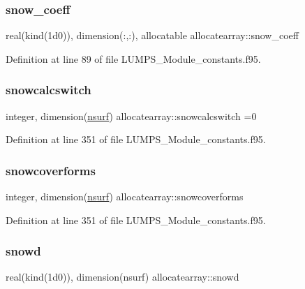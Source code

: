 \subsubsection{\texorpdfstring{snow\+\_\+coeff}{snow\_coeff}}
{\footnotesize\ttfamily real(kind(1d0)), dimension(\+:,\+:), allocatable allocatearray\+::snow\+\_\+coeff}



Definition at line 89 of file L\+U\+M\+P\+S\+\_\+\+Module\+\_\+constants.\+f95.

\mbox{\label{namespaceallocatearray_ae1fb990049408fe1fa4f557577937ed6}} 
\subsubsection{\texorpdfstring{snowcalcswitch}{snowcalcswitch}}
{\footnotesize\ttfamily integer, dimension(\hyperlink{namespaceallocatearray_acd22f92a06f7e9a2a91426b3dc99fdb0}{nsurf}) allocatearray\+::snowcalcswitch =0}



Definition at line 351 of file L\+U\+M\+P\+S\+\_\+\+Module\+\_\+constants.\+f95.

\mbox{\label{namespaceallocatearray_aa5bce865502bab8845c8ce638efee764}} 
\subsubsection{\texorpdfstring{snowcoverforms}{snowcoverforms}}
{\footnotesize\ttfamily integer, dimension(\hyperlink{namespaceallocatearray_acd22f92a06f7e9a2a91426b3dc99fdb0}{nsurf}) allocatearray\+::snowcoverforms}



Definition at line 351 of file L\+U\+M\+P\+S\+\_\+\+Module\+\_\+constants.\+f95.

\mbox{\label{namespaceallocatearray_af472b50234fe5d6af80ebf8a3b2a1863}} 
\subsubsection{\texorpdfstring{snowd}{snowd}}
{\footnotesize\ttfamily real(kind(1d0)), dimension(nsurf) allocatearray\+::snowd}



